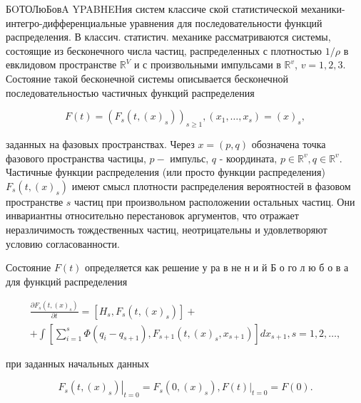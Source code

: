 \documentclass[10pt]{article}
\begin{document}
БOТОЛюБовA YPABHEHия систем классиче ской статистической механики- интегро-дифференциальные уравнения для последовательности функций распределения. В классич. статистич. механике рассматриваются системы, состоящие из бесконечного числа частиц, распределенных с плотностью $1 / \rho$ в евклидовом пространстве $\mathbb{R}^{V}$ и с произвольными импульсами в $\mathbb{R}^{v}$, $v=1,2,3$. Состояние такой бесконечной системы описывается бесконечной последовательностью частичных функций распределения



\[

F(t)=\left(F_{s}\left(t,(x)_{s}\right)\right)_{s \geqslant 1},\left(x_{1}, \ldots, x_{s}\right)=(x)_{s},

\]



заданных на фазовых пространствах. Через $x=(p, q)$ обозначена точка фазового пространства частицы, $p-$ импульс, $q$ - координата, $p \in \mathbb{R}^{v}, q \in \mathbb{R}^{v}$. Частичные функции распределения (или просто функции распределения) $F_{s}\left(t,(x)_{s}\right)$ имеют смысл плотности распределения вероятностей в фазовом пространстве $s$ частиц при произвольном расположении остальных частиц. Они инвариантны относительно перестановок аргументов, что отражает неразличимость тождественных частиц, неотрицательны и удовлетворяют условию согласованности.



Состояние $F(t)$ определяется как решение у ра в не н и й Б о го л ю б о в а для функций распределения



\[

\begin{gathered}

\frac{\partial F_{s}\left(t,(x)_{s}\right)}{\partial t}=\left[H_{s}, F_{s}\left(t,(x)_{s}\right)\right]+ \\

+\int\left[\sum_{i=1}^{s} \Phi\left(q_{i}-q_{s+1}\right), F_{s+1}\left(t,(x)_{s}, x_{s+1}\right)\right] d x_{s+1}, s=1,2, \ldots,

\end{gathered}

\]



при заданных начальных данных



\[

\left.F_{s}\left(t,(x)_{s}\right)\right|_{t=0}=F_{s}\left(0,(x)_{s}\right),\left.F(t)\right|_{t=0}=F(0) .

\]
\end{document}
